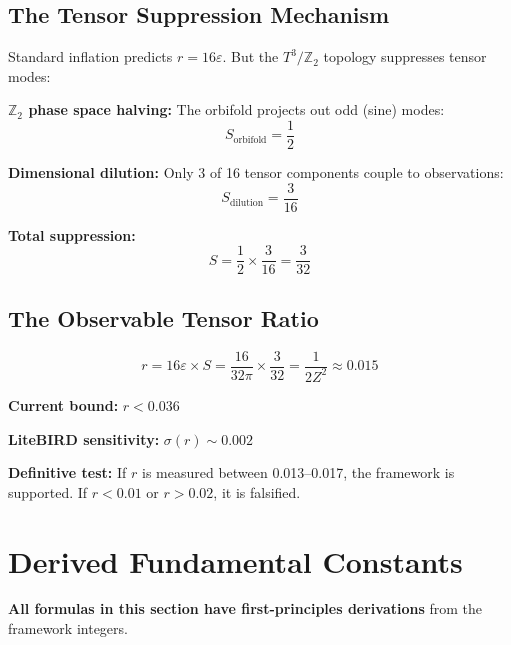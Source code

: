 \documentclass[12pt,a4paper]{article}
\newcommand{\Ztwo}{\mathbb{Z}_2}
\newcommand{\Tthree}{T^3}
\newcommand{\Zsq}{Z^2}
\begin{document}
\subsection{The Tensor Suppression Mechanism}

Standard inflation predicts $r = 16\varepsilon$. But the $\Tthree/\Ztwo$ topology suppresses tensor modes:

\textbf{$\Ztwo$ phase space halving:} The orbifold projects out odd (sine) modes:
\begin{equation}
S_{\text{orbifold}} = \frac{1}{2}
\end{equation}

\textbf{Dimensional dilution:} Only 3 of 16 tensor components couple to observations:
\begin{equation}
S_{\text{dilution}} = \frac{3}{16}
\end{equation}

\textbf{Total suppression:}
\begin{equation}
S = \frac{1}{2} \times \frac{3}{16} = \frac{3}{32}
\end{equation}

\subsection{The Observable Tensor Ratio}

\begin{equation}
\boxed{r = 16\varepsilon \times S = \frac{16}{32\pi} \times \frac{3}{32} = \frac{1}{2\Zsq} \approx 0.015}
\end{equation}

\textbf{Current bound:} $r < 0.036$ \checkmark

\textbf{LiteBIRD sensitivity:} $\sigma(r) \sim 0.002$

\textbf{Definitive test:} If $r$ is measured between 0.013--0.017, the framework is supported. If $r < 0.01$ or $r > 0.02$, it is falsified.

\section{Derived Fundamental Constants}
\label{sec:constants}

\textbf{All formulas in this section have first-principles derivations} from the framework integers.
\end{document}

